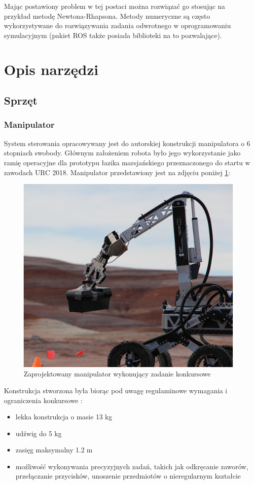 \documentclass[a4paper, 12pt, twoside]{article}
\begin{document}
Mając postawiony problem w tej postaci można rozwiązać go stosując na przykład metodę Newtona-Rhapsona. Metody numeryczne są często wykorzystywane do rozwiązywania zadania odwrotnego w oprogramowaniu symulacyjnym (pakiet ROS także posiada biblioteki na to pozwalające).

\newpage
\vspace*{1.5 cm}
\section{Opis narzędzi}
\vspace{1.5 cm}

\subsection{Sprzęt}

\subsubsection{Manipulator}
System sterowania opracowywany jest do autorskiej konstrukcji manipulatora o 6 stopniach swobody. Głównym założeniem robota było jego wykorzystanie jako ramię operacyjne dla prototypu łazika marsjańskiego przeznaczonego do startu w zawodach URC 2018. Manipulator przedstawiony jest na zdjęciu poniżej \ref{fig:manipulator_photo}:

\begin{figure}[hbt!]
\centering
\includegraphics[width=0.5\linewidth]{images/manipulator_photo.png}
\caption{Zaprojektowany manipulator wykonujący zadanie konkursowe }
\label{fig:manipulator_photo}
\end{figure}

Konstrukcja stworzona była biorąc pod uwagę regulaminowe wymagania i ograniczenia konkursowe \cite{competitionwebsite}:

\begin{itemize}
\item lekka konstrukcja o masie 13 kg
\item udźwig do 5 kg
\item zasięg maksymalny 1.2 m
\item moźliwość wykonywania precyzyjnych zadań, takich jak odkręcanie zaworów, przełączanie przycisków, unoszenie przedmiotów o nieregularnym kształcie
\end{itemize}
\end{document}
